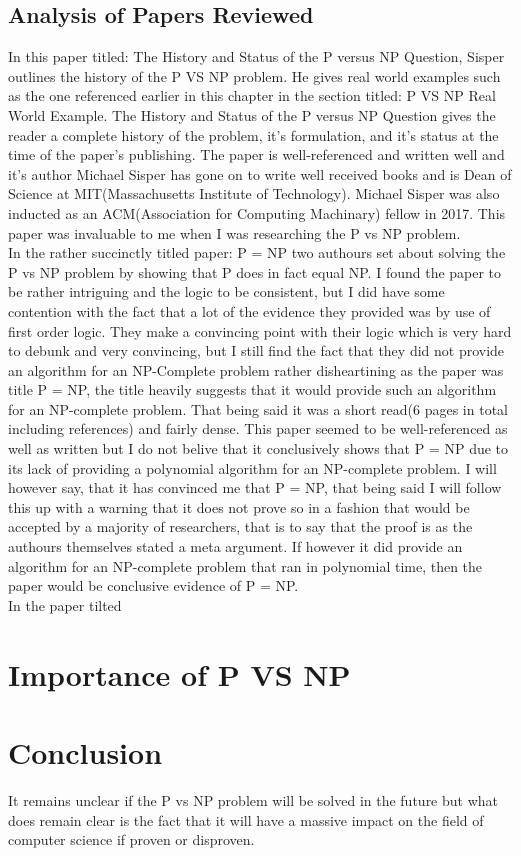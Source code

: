 \documentclass{report}
\begin{document}
\section{Analysis of Papers Reviewed}
In this paper titled: The History and Status of the P versus NP Question\cite{HistoryOfPVsNP}, Sisper outlines the history of the P VS NP problem.  He gives real world examples such as the one referenced earlier in this chapter in the section titled: P VS NP Real World Example.  The History and Status of the P versus NP Question gives the reader a complete history of the problem, it's formulation, and it's status at the time of the paper's publishing.  The paper is well-referenced and written well and it's author Michael Sisper has gone on to write well received books\cite{Sisperbib} and is Dean of Science at MIT(Massachusetts Institute of Technology)\cite{Sisperdean}.  Michael Sisper was also inducted as an ACM(Association for Computing Machinary) fellow in 2017\cite{Sisperacm}. This paper was invaluable to me when I was researching the P vs NP problem.
\\
In the rather succinctly titled paper: P = NP\cite{PVsNPSolved} two authours set about solving the P vs NP problem by showing that P does in fact equal NP.  I found the paper to be rather intriguing and the logic to be consistent, but I did have some contention with the fact that a lot of the evidence they provided was by use of first order logic.  They make a convincing point with their logic which is very hard to debunk and very convincing, but I still find the fact that they did not provide an algorithm for an NP-Complete problem rather disheartining as the paper was title P = NP, the title heavily suggests that it would provide such an algorithm for an NP-complete problem.  That being said it was a short read(6 pages in total including references) and fairly dense.  This paper seemed to be well-referenced as well as written but I do not belive that it conclusively shows that P = NP due to its lack of providing a polynomial algorithm for an NP-complete problem.  I will however say, that it has convinced me that P = NP, that being said I will follow this up with a warning that it does not prove so in a fashion that would be accepted by a majority of researchers, that is to say that the proof is as the authours themselves stated a meta argument.  If however it did provide an algorithm for an NP-complete problem that ran in polynomial time, then the paper would be conclusive evidence of P = NP.
\\
In the paper tilted
\chapter{Importance of P VS NP}
\chapter{Conclusion}
It remains unclear if the P vs NP problem will be solved in the future but what does remain clear is the fact that it will have a massive impact on the field of computer science if proven or disproven.


\end{document}
